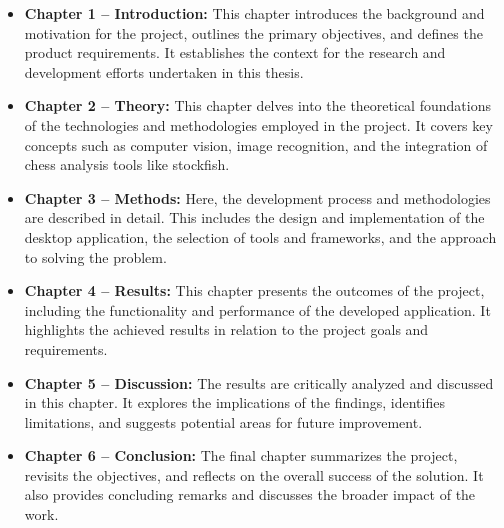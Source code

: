 \begin{itemize}
    \item \textbf{Chapter 1 -- Introduction:} This chapter introduces the background and motivation for the project, outlines the primary objectives, and defines the product requirements. It establishes the context for the research and development efforts undertaken in this thesis.
    
    \item \textbf{Chapter 2 -- Theory:} This chapter delves into the theoretical foundations of the technologies and methodologies employed in the project. It covers key concepts such as computer vision, image recognition, and the integration of chess analysis tools like \gls{stockfish}.
    
    \item \textbf{Chapter 3 -- Methods:} Here, the development process and methodologies are described in detail. This includes the design and implementation of the desktop application, the selection of tools and frameworks, and the approach to solving the problem.
    
    \item \textbf{Chapter 4 -- Results:} This chapter presents the outcomes of the project, including the functionality and performance of the developed application. It highlights the achieved results in relation to the project goals and requirements.
    
    \item \textbf{Chapter 5 -- Discussion:} The results are critically analyzed and discussed in this chapter. It explores the implications of the findings, identifies limitations, and suggests potential areas for future improvement.
    
    \item \textbf{Chapter 6 -- Conclusion:} The final chapter summarizes the project, revisits the objectives, and reflects on the overall success of the solution. It also provides concluding remarks and discusses the broader impact of the work.
\end{itemize}






%     

